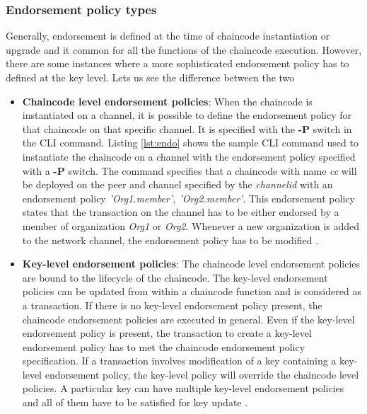 \documentclass[
  a4paper,  %
  twoside,  %
  bibliography=totoc,
  headsepline,
  cleardoublepage=empty,
  parskip=half,
  draft=false
]{scrbook}
\begin{document}
\subsubsection{Endorsement policy types}
Generally, endorsement is defined at the time of chaincode instantiation or upgrade and it common for all the functions of the chaincode execution. However, there are some instances where a more sophisticated endorsement policy has to defined at the key level. Lets us see the difference between the two
\begin{itemize}
    \item \textbf{Chaincode level endorsement policies}: When the chaincode is instantiated on a channel, it is possible to define the endorsement policy for that chaincode on that specific channel. It is specified with the \textbf{-P} switch in the CLI command. Listing \ref{lst:endo} shows the sample CLI command used to instantiate the chaincode on a channel with the endorsement policy specified with a \textbf{-P} switch. The command specifies that a chaincode with name \textit{cc} will be deployed on the peer and channel specified by the \textit{channelid} with an endorsement policy \textit{'Org1.member', 'Org2.member'}. This endorsement policy states that the transaction on the channel has to be either endorsed by a member of organization \textit{Org1} or \textit{Org2}. Whenever a new organization is added to the network channel, the endorsement policy has to be modified \cite{Endorsement}.
    \item \textbf{Key-level endorsement policies}: The chaincode level endorsement policies are bound to the lifecycle of the chaincode. The key-level endorsement policies can be updated from within a chaincode function and is considered as a transaction. If there is no key-level endorsement policy present, the chaincode endorsement policies are executed in general. Even if the key-level endorsement policy is present, the transaction to create a key-level endorsement policy has to met the chaincode endorsement policy specification. If a transaction involves modification of a key containing a key-level endorsement policy, the key-level policy will override the chaincode level policies. A particular key can have multiple key-level endorsement policies and all of them have to be satisfied for key update \cite{Endorsement}. 
\end{itemize}
\end{document}
